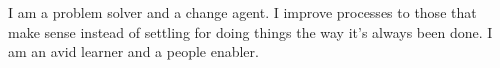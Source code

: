 \documentclass[9pt]{developercv} %
\begin{document}
\vspace{0.5cm}



\begin{minipage}[t]{0.43\textwidth} %
	\vspace{-\baselineskip} %
	
	I am a problem solver and a change agent. 
	I improve processes to those that make sense instead of settling for doing things the way it's always been done. I am an avid learner and a people enabler.
\end{minipage}
\hfill %
\begin{minipage}[t]{0.5\textwidth} %
	\vspace{-\baselineskip} %
	\begin{barchart}{5.5}
	\end{barchart}
\end{minipage}


\end{document}
